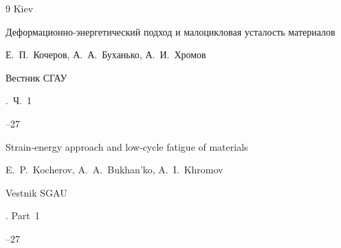\begin{thebibliography}{9}
\publaddr Kiev 








\paper Деформационно-энергетический подход и малоцикловая усталость материалов

\by Е.~П.~Кочеров, А.~А.~Буханько, А.~И.~Хромов

\jour Вестник СГАУ


.~Ч.~1

--27


\misctransl

\paper Strain-energy approach and low-cycle fatigue of materials

\by E.~P.~Kocherov, A.~A.~Bukhan'ko, A.~I.~Khromov

\jour Vestnik SGAU


. Part~1

--27





\end{thebibliography}



\noindent

\hskip6.5cm \thedate \par\noindent

\hskip6.5cm\therevdate

%





\newpage






\makeengtitlem







\newpage

%


%

%

